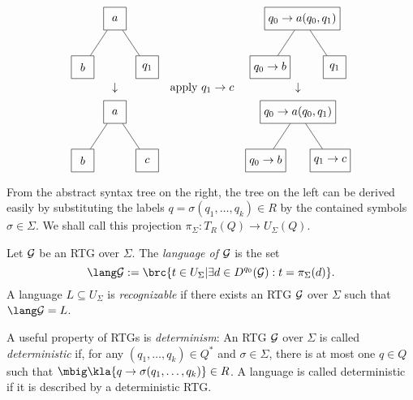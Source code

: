 \[\begin{matrix}
\begin{tikzpicture}[every node/.style={rectangle,draw,minimum size=2em},baseline=(current bounding box.center)]
  \node (n) at (0,0) { $a$ };
  \node (n1) at (-1,-1.5) { $b$ } edge (n);
  \node (n2) at (+1,-1.5) { $q_1$ } edge (n);
 \end{tikzpicture}
 &\hspace*{4em}&
 \begin{tikzpicture}[every node/.style={rectangle,draw,minimum size=2em},baseline=(current bounding box.center)]
  \node (n) at (0,0) { $q_0 \to a(q_0,q_1)$ };
  \node (n1) at (-1,-1.5) { $q_0\to b$ } edge (n);
  \node (n2) at (+1,-1.5) { $q_1$ } edge (n);
 \end{tikzpicture}
 \\\\[-1em]
 \downarrow & \text{apply } q_1\to c & \downarrow \\[0.5em]
 \begin{tikzpicture}[every node/.style={rectangle,draw,minimum size=2em},baseline=(current bounding box.center)]
  \node (n) at (0,0) { $a$ };
  \node (n1) at (-1,-1.5) { $b$ } edge (n);
  \node (n2) at (+1,-1.5) { $c$ } edge (n);
 \end{tikzpicture}
 &\hspace*{4em}&
 \begin{tikzpicture}[every node/.style={rectangle,draw,minimum size=2em},baseline=(current bounding box.center)]
  \node (n) at (0,0) { $q_0 \to a(q_0,q_1)$ };
  \node (n1) at (-1,-1.5) { $q_0\to b$ } edge (n);
  \node (n2) at (+1,-1.5) { $q_1\to c$ } edge (n);
 \end{tikzpicture}
\end{matrix}\]

From the abstract syntax tree on the right, the tree on the left can be derived easily
by substituting the labels $q = \sigma(q_1,\ldots,q_k)\in R$ by the contained
symbols $\sigma\in\Sigma$. We shall call this projection $\pi_\Sigma: T_R(Q)\to U_\Sigma(Q)$.

\begin{definition}
 Let $\mathcal G$ be an RTG over $\Sigma$. The \emph{language of $\mathcal G$} is the set
 \[
  \lang\ug := \brc{t\in U_\Sigma | \exists d\in D^{q_0}(\ug): t=\pi_\Sigma(d)}.
 \]
 A language $L\subseteq U_\Sigma$ is \emph{recognizable} if there exists an RTG
 $\mathcal G$ over $\Sigma$ such that $\lang\ug = L$.
\end{definition}

A useful property of RTGs is \emph{determinism}: An RTG $\mathcal G$ over $\Sigma$ is
called \emph{deterministic} if, for any $(q_1,\ldots,q_k)\in Q^*$ and
$\sigma\in\Sigma$, there is at most one $q\in Q$ such that $\mbig\kla{q \to
\sigma(q_1,\ldots,q_k)} \in R$. A language is called deterministic if it is
described by a deterministic RTG.

